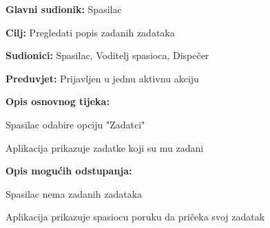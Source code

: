 		
\newpage
	\noindent {}
	\begin{packed_item}
		
		\item \textbf{Glavni sudionik: }Spasilac
		\item  \textbf{Cilj:} Pregledati popis zadanih zadataka
		\item  \textbf{Sudionici:} Spasilac, Voditelj spasioca, Dispečer
		\item  \textbf{Preduvjet:} Prijavljen u jednu aktivnu akciju
		\item  \textbf{Opis osnovnog tijeka:}
		
		\item[] \begin{packed_enum}
			
			\item Spasilac odabire opciju "Zadatci"
			\item Aplikacija prikazuje zadatke koji su mu zadani
		
		\end{packed_enum}
		
		\item  \textbf{Opis mogućih odstupanja:}
		
		\item[] \begin{packed_item}
			
			\item[2.a] Spasilac nema zadanih zadataka
			\item[] \begin{packed_enum}
				
				\item Aplikacija prikazuje spasiocu poruku
						da pričeka svoj zadatak\\
				
			\end{packed_enum}	
		\end{packed_item}
	\end{packed_item}
	
